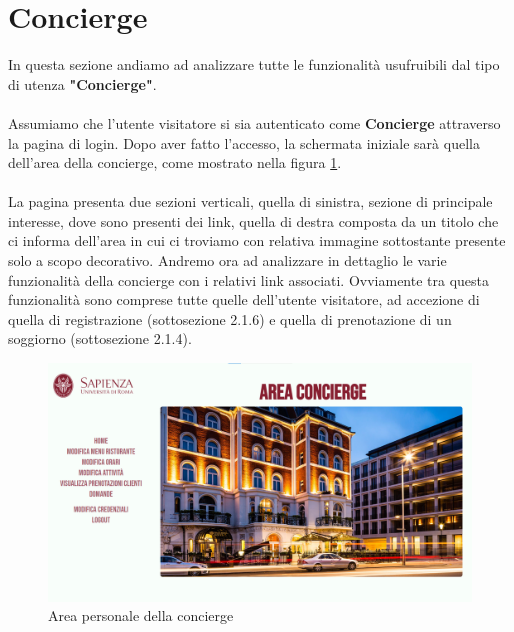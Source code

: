 \documentclass [a4paper, 12pt]{book}
\begin{document}
\section{Concierge}
In questa sezione andiamo ad analizzare tutte le funzionalità usufruibili dal tipo di utenza \textbf{"Concierge"}.\\\\
Assumiamo che l'utente visitatore si sia autenticato come \textbf{Concierge} attraverso la pagina di login. Dopo aver fatto l'accesso, la schermata iniziale sarà quella dell'area della concierge, come mostrato nella figura \ref{AreaConcierge}. \\\\
La pagina presenta due sezioni verticali, quella di sinistra, sezione di principale interesse, dove sono presenti dei link, quella di destra composta da un titolo che ci informa dell'area in cui ci troviamo con relativa immagine sottostante presente solo a scopo decorativo. Andremo ora ad analizzare in dettaglio le varie funzionalità della concierge con i relativi link associati. Ovviamente tra questa funzionalità sono comprese tutte quelle dell'utente visitatore, ad accezione di quella di registrazione (sottosezione 2.1.6) e quella di prenotazione di un soggiorno (sottosezione 2.1.4).
\begin{figure}[!h]
\centering
\includegraphics[scale=0.3]{AreaConcierge.png}
\caption{Area personale della concierge}
\label{AreaConcierge}
\end{figure}
\end{document}

